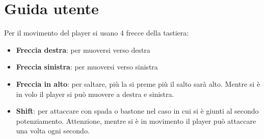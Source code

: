 \documentclass[a4paper,12pt]{report}
\begin{document}
\chapter{Guida utente}
Per il movimento del player si usano 4 frecce della tastiera:
\begin{itemize}
    \item \textbf{Freccia destra}: per muoversi verso destra
    \item \textbf{Freccia sinistra}: per muoversi verso sinistra
    \item \textbf{Freccia in alto}: per saltare, più la si preme più il salto sarà alto.
    Mentre si è in volo il player si può muovere a destra e sinistra.
    \item \textbf{Shift}: per attaccare con spada o bastone nel caso in cui si è giunti al secondo potenziamento.
    Attenzione, mentre si è in movimento il player può attaccare una volta ogni secondo.
\end{itemize}
\end{document}
